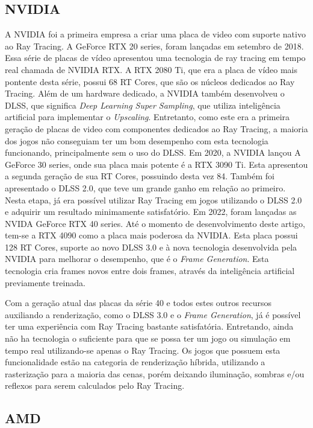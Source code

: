 \documentclass[journal]{IEEEtran}
\begin{document}
\subsection{NVIDIA}
A NVIDIA foi a primeira empresa a criar uma placa de video com suporte nativo ao
Ray Tracing. A GeForce RTX 20 series, foram lançadas em setembro de 2018. Essa 
série de placas de vídeo apresentou uma tecnologia de ray tracing em tempo real 
chamada de NVIDIA RTX. A RTX 2080 Ti, que era a placa de vídeo mais pontente
desta série, possui 68 RT Cores, que são os núcleos dedicados ao Ray Tracing.
Além de um hardware dedicado, a NVIDIA também desenvolveu o DLSS, que significa
\emph{Deep Learning Super Sampling}, que utiliza inteligência artificial para
implementar o \emph{Upscaling}. Entretanto, como este era a primeira geração
de placas de video com componentes dedicados ao Ray Tracing, a maioria dos
jogos não conseguiam ter um bom desempenho com esta tecnologia funcionando,
principalmente sem o uso do DLSS. Em 2020, a NVIDIA lançou A GeForce 30
series, onde sua placa mais potente é a RTX 3090 Ti. Esta apresentou a
segunda geração de sua RT Cores, possuindo desta vez 84. Também foi apresentado
o DLSS 2.0, que teve um grande ganho em relação ao primeiro. Nesta etapa,
já era possível utilizar Ray Tracing em jogos utilizando o DLSS 2.0 e
adquirir um resultado minimamente satisfatório. Em 2022, foram lançadas as
NVIDA GeForce RTX 40 series. Até o momento de desenvolvimento deste artigo,
tem-se a RTX 4090 como a placa mais poderosa da NVIDIA. Esta placa possui
128 RT Cores, suporte ao novo DLSS 3.0 e à nova tecnologia desenvolvida
pela NVIDIA para melhorar o desempenho, que é o \emph{Frame Generation}.
Esta tecnologia cria frames novos entre dois frames, através da inteligência
artificial previamente treinada. 

Com a geração atual das placas da série 40 e todos estes outros recursos auxiliando
a renderização, como o DLSS 3.0 e o \emph{Frame Generation}, já é possível ter uma
experiência com Ray Tracing bastante satisfatória. Entretando, ainda não ha 
tecnologia o suficiente para que se possa ter um jogo ou simulação em
tempo real utilizando-se apenas o Ray Tracing. Os jogos que possuem esta
funcionalidade estão na categoria de renderização híbrida, utilizando a
rasterização para a maioria das cenas, porém deixando iluminação, sombras e/ou
reflexos para serem calculados pelo Ray Tracing.

\subsection{AMD}
\end{document}
